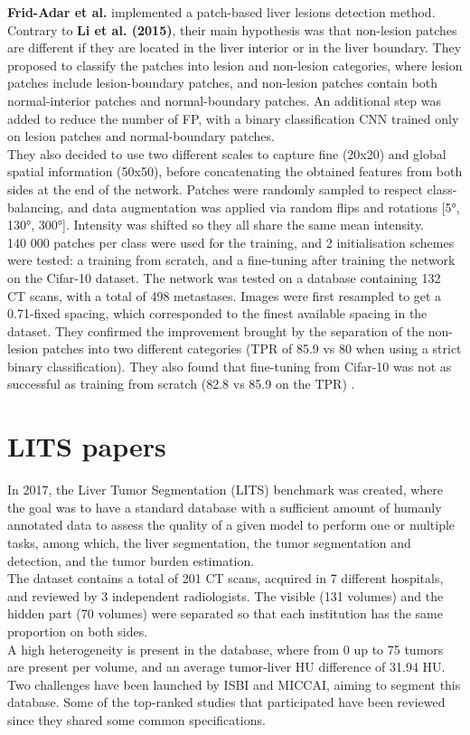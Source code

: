 \textbf{Frid-Adar et al.} implemented a patch-based liver lesions
detection method. Contrary to \textbf{Li et al. (2015)}, their main
hypothesis was that non-lesion patches are different if they are located
in the liver interior or in the liver boundary. They proposed to
classify the patches into lesion and non-lesion categories, where lesion
patches include lesion-boundary patches, and non-lesion patches contain
both normal-interior patches and normal-boundary patches. An additional
step was added to reduce the number of FP, with a binary classification
CNN trained only on lesion patches and normal-boundary patches. \\
They also decided to use two different scales to capture fine (20x20)
and global spatial information (50x50), before concatenating the
obtained features from both sides at the end of the network. Patches
were randomly sampled to respect class-balancing, and data augmentation
was applied via random flips and rotations {[}5°, 130°, 300°{]}.
Intensity was shifted so they all share the same mean intensity. \\
140 000 patches per class were used for the training, and 2
initialisation schemes were tested: a training from scratch, and a
fine-tuning after training the network on the Cifar-10 dataset. The
network was tested on a database containing 132 CT scans, with a total
of 498 metastases. Images were first resampled to get a 0.71-fixed
spacing, which corresponded to the finest available spacing in the
dataset. They confirmed the improvement brought by the separation of the
non-lesion patches into two different categories (TPR of 85.9 vs 80 when
using a strict binary classification). They also found that fine-tuning
from Cifar-10 was not as successful as training from scratch (82.8 vs
85.9 on the TPR) .

\section{LITS papers}\label{lits-papers}

In 2017, the Liver Tumor Segmentation (LITS) benchmark was created,
where the goal was to have a standard database with a sufficient amount
of humanly annotated data to assess the quality of a given model to
perform one or multiple tasks, among which, the liver segmentation, the
tumor segmentation and detection, and the tumor burden estimation. \\
The dataset contains a total of 201 CT scans, acquired in 7 different
hospitals, and reviewed by 3 independent radiologists. The visible (131
volumes) and the hidden part (70 volumes) were separated so that each
institution has the same proportion on both sides. \\
A high heterogeneity is present in the database, where from 0 up to 75
tumors are present per volume, and an average tumor-liver HU difference
of 31.94 HU. \\
Two challenges have been launched by ISBI and MICCAI, aiming to segment
this database. Some of the top-ranked studies that participated have
been reviewed since they shared some common specifications.

